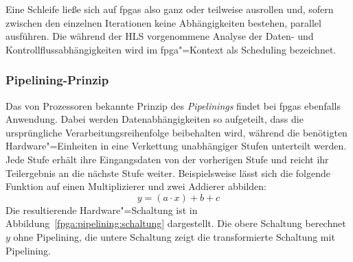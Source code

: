 Eine Schleife ließe sich auf \gls{fpga}s also ganz oder teilweise ausrollen und,
sofern zwischen den einzelnen Iterationen keine Abhängigkeiten bestehen,
parallel ausführen. Die während der HLS vorgenommene Analyse der Daten- und
Kontrollflussabhängigkeiten wird im \gls{fpga}"=Kontext als Scheduling
bezeichnet. \cite[vgl.][19]{hlsintro2019}

\subsubsection{Pipelining-Prinzip}

Das von Prozessoren bekannte Prinzip des \textit{Pipelinings} findet bei
\gls{fpga}s ebenfalls Anwendung. Dabei werden Datenabhängigkeiten so aufgeteilt,
dass die ursprüngliche Verarbeitungsreihenfolge beibehalten wird, während die
benötigten Hardware"=Einheiten in eine Verkettung unabhängiger Stufen unterteilt
werden. Jede Stufe erhält ihre Eingangsdaten von der vorherigen Stufe und reicht
ihr Teilergebnis an die nächste Stufe weiter. Beispielsweise lässt sich die
folgende Funktion auf einen Multiplizierer und zwei Addierer abbilden:
\[
    y = (a \cdot x) + b + c
\]
Die resultierende Hardware"=Schaltung ist in
Abbildung~\ref{fpga:pipelining:schaltung} dargestellt. Die obere Schaltung
berechnet $y$ ohne Pipelining, die untere Schaltung zeigt die transformierte
Schaltung mit Pipelining.
